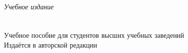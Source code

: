 \newpage
\thispagestyle{empty}
~\vfill
\begin{centering}
  \textit{Учебное издание}\\[18pt]
  \textsc{\Title}\\[6pt]
  \PubType\\[18pt]
  Учебное пособие для студентов высших учебных заведений\\[18pt]
  Издаётся в авторской редакции\\
\end{centering}
\vspace{3cm}
